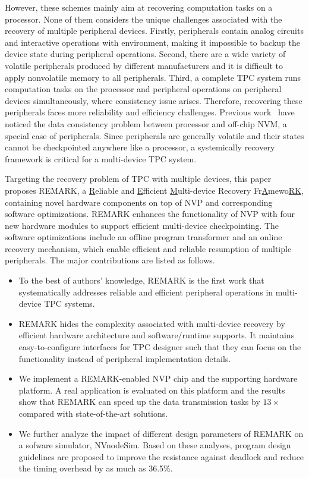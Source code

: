 However, these schemes mainly aim at recovering computation tasks on a processor. 
None of them considers the unique challenges associated with the recovery of multiple peripheral devices.
Firstly, peripherals contain analog circuits and interactive operations with environment, making it impossible to backup the device state during peripheral operations.
Second, there are a wide variety of volatile peripherals produced by different manufacturers and it is difficult to apply nonvolatile memory to all peripherals. 
Third, a complete TPC system runs computation tasks on the processor and peripheral operations on peripheral devices simultaneously, where consistency issue arises.
Therefore, recovering these peripherals faces more reliability and efficiency challenges. 
Previous work~\cite{Xie2015,van2016intermittent,Lucia2015} have noticed the data consistency problem between processor and off-chip NVM,  a special case of peripherals. 
Since peripherals are generally volatile and their states cannot be checkpointed anywhere like a processor, a systemically recovery framework is critical for a multi-device TPC system.

Targeting the recovery problem of TPC with multiple devices, this paper proposes REMARK, a \underline{R}eliable and \underline{E}fficient \underline{M}ulti-device Recovery Fr\underline{A}mewo\underline{RK}, containing novel hardware components on top of NVP and corresponding software optimizations.
REMARK enhances the functionality of NVP with four new hardware modules to support efficient multi-device checkpointing.
The software optimizations include an offline program transformer and an online recovery mechanism, which enable efficient and reliable resumption of multiple peripherals.
The major contributions are listed as follows.

%
\begin{itemize}
    \item To the best of authors' knowledge, REMARK is the first work that systematically addresses reliable and efficient peripheral operations in multi-device TPC systems.

    \item REMARK hides the complexity associated with multi-device recovery by efficient hardware architecture and software/runtime supports. It maintains easy-to-configure interfaces for TPC designer such that they can focus on the functionality instead of peripheral implementation details. 

    \item We implement a REMARK-enabled NVP chip and the supporting hardware platform. A real application is evaluated on this platform and the results show that REMARK can speed up the data transmission tasks by $13\times$ compared with state-of-the-art solutions. 

    \item We further analyze the impact of different design parameters of REMARK on a sofware simulator, NVnodeSim. Based on these analyses, program design guidelines are proposed to improve the resistance against deadlock and reduce the timing overhead by as much as 36.5\%.
\end{itemize}

